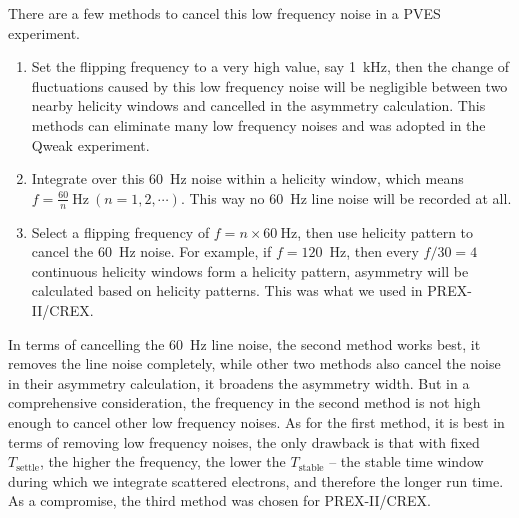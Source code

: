 There are a few methods to cancel this low frequency noise in a PVES experiment.
\begin{enumerate}
    \item Set the flipping frequency to a very high value, say 1~kHz, then
	the change of fluctuations caused by this low frequency noise will be negligible
	between two nearby helicity windows and cancelled in the asymmetry calculation. 
	This methods can eliminate many low frequency noises and was adopted in the Qweak experiment.
    \item Integrate over this 60~Hz noise within a helicity window, which means
	$f = \frac{60}{n}\ \mathrm{Hz}\ (n = 1, 2, \cdots)$. This way no 60~Hz line noise
	will be recorded at all.
    \item Select a flipping frequency of $f = n \times 60 \ \mathrm{Hz}$,
	then use helicity pattern to cancel the 60~Hz noise. For example, 
	if $f = 120$~Hz, then every $f/30 = 4$ continuous helicity windows form a 
	helicity pattern, asymmetry will be calculated based on helicity patterns. 
	This was what we used in PREX-II/CREX.
\end{enumerate}

In terms of cancelling the 60~Hz line noise, the second method works best,
it removes the line noise completely, while other two methods also cancel the noise
in their asymmetry calculation, it broadens the asymmetry width. But in a comprehensive
consideration, the frequency in the second method is not high enough to cancel
other low frequency noises. As for the first method, it is best in terms of
removing low frequency noises, the only drawback is that with fixed $T_{\text{settle}}$,
the higher the frequency, the lower the $T_{\text{stable}}$ -- the stable time window
during which we integrate scattered electrons, and therefore the longer run time. 
As a compromise, the third method was chosen for PREX-II/CREX.

